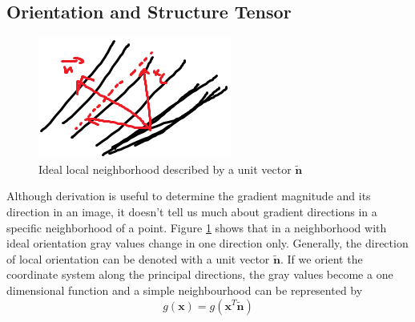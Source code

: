 		
		\subsection{Orientation and Structure Tensor}
		\begin{figure} %
			\centering
			\includegraphics[scale=1]{images/structure_tensor_intro.png}
			\caption{Ideal local neighborhood described by a unit vector $\tilde{\mathbf{n}}$}
			\label{fig:struct_tensor_intro}
		\end{figure}
		Although derivation is useful to determine the gradient magnitude and its direction in an image, it doesn't tell us much about gradient directions in a specific neighborhood of a point. Figure \ref{fig:struct_tensor_intro} shows that in a neighborhood with ideal orientation gray values change in one direction only. Generally, the direction of local orientation can be denoted with a unit vector $\tilde{\mathbf{n}}$. If we orient the coordinate system along the principal directions, the gray values become a one dimensional function and a simple neighbourhood can be represented by
		\begin{equation}
			g(\mathbf{x}) = g(\mathbf{x}^T \tilde{\mathbf{n}})
		\end{equation}


